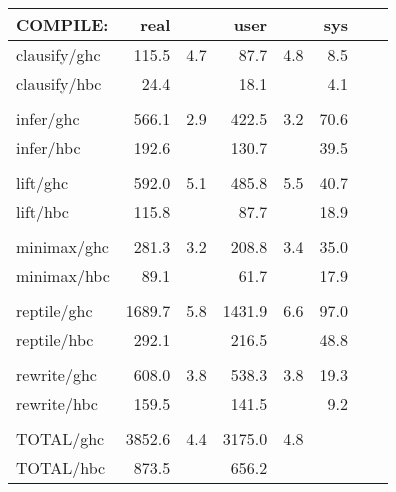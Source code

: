 \begin{slide}{}
\begin{center}
\begin{tabular}{lrrrrrrr}
COMPILE:    & real && user && sys \\ \hline
clausify/ghc&  115.5&  4.7&   87.7&  4.8&  8.5\\
clausify/hbc&   24.4&&   18.1&&  4.1\\
\\
infer/ghc&  566.1&  2.9&  422.5&  3.2& 70.6\\
infer/hbc&  192.6&&  130.7&& 39.5\\
\\
lift/ghc&  592.0&  5.1&  485.8&  5.5& 40.7\\
lift/hbc&  115.8&&   87.7&& 18.9\\
\\
minimax/ghc&  281.3&  3.2&  208.8&  3.4& 35.0\\
minimax/hbc&   89.1&&   61.7&& 17.9\\
\\
reptile/ghc& 1689.7&  5.8& 1431.9&  6.6& 97.0\\
reptile/hbc&  292.1&&  216.5&& 48.8\\
\\
rewrite/ghc&  608.0&  3.8&  538.3&  3.8& 19.3\\
rewrite/hbc&  159.5&&  141.5&&  9.2\\
\\
TOTAL/ghc& 3852.6&  4.4& 3175.0&  4.8\\
TOTAL/hbc&  873.5&&  656.2
\end{tabular}
\end{center}
\end{slide}

